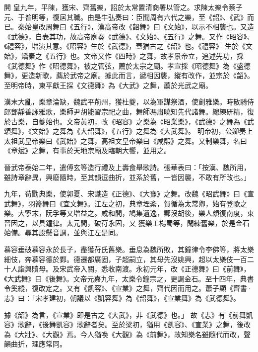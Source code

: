 
\begin{pinyinscope}

 開
 皇九年，平陳，獲宋、齊舊樂，詔於太常置清商署以管之。求陳太樂令蔡子元、于普明等，復居其職。由是牛弘奏曰：臣聞周有六代之樂，至《韶》、《武》而已。秦始皇改周舞曰《五行》，漢高帝改《韶舞》曰《文始》，以示不相襲也。又造《武德》，自表其功，故高帝廟奏《武德》、《文始》、《五行》之舞。又作《昭容》、《禮容》，增演其意。《昭容》生於《武德》，蓋猶古之《韶》也。《禮容》
 生於《文始》，矯秦之《五行》也。文帝又作《四時》之舞，故孝景帝立，追述先功，採《武德舞》作《昭德舞》，被之管弦，薦於太宗之廟。孝宣採《昭德舞》為《盛德舞》，更造新歌，薦於武帝之廟。據此而言，遞相因襲，縱有改作，並宗於《韶》。至明帝時，東平獻王採《文德舞》為《大武》之舞，薦於光武之廟。



 漢末大亂，樂章淪缺，魏武平荊州，獲杜夔，以為軍謀祭酒，使創雅樂。時散騎侍郎鄧靜善詠雅歌，樂師尹胡能習宗祀之曲，舞師馮肅曉知先代諸舞。總練研精，復於古樂，自夔始也。文帝黃初，改《昭容》之樂為《昭業樂》，《武德》之舞為《武頌舞》，《文始》之舞為《大韶舞》，《五行》之舞為《大武舞》。
 明帝初，公卿奏上太祖武皇帝樂曰《武始》之舞，高祖文皇帝樂曰《咸熙》之舞。又制樂舞，名曰《章斌》之舞，有事於天地宗廟及臨朝大饗，並用之。



 晉武帝泰始二年，遣傅玄等造行禮及上壽食舉歌詩。張華表曰：「按漢、魏所用，雖詩章辭異，興廢隨時，至其韻逗曲折，並系於舊，一皆因襲，不敢有所改也。」



 九年，荀勖典樂，使郭夏、宋識造《正德》、《大豫》之舞。改魏《昭武舞》曰《宣武舞》，羽籥舞曰《宜文舞》。江左之初，典章堙紊，賀循為太常卿，始有登歌之樂。大寧末，阮孚等又增益之。咸和間，鳩集遺逸，鄴沒胡後，樂人頗復南度，東晉因之，以具鐘律。太元間，破苻永固，又
 獲樂工楊蜀等，閑練舊樂，於是金石始備。尋其設懸音調，並與江左是同。



 慕容垂破慕容永於長子，盡獲苻氏舊樂。垂息為魏所敗，其鐘律令李佛等，將太樂細伎，奔慕容德於鄴。德遷都廣固，子超嗣立，其母先沒姚興，超以太樂伎一百二十人詣興贖母。及宋武帝入關，悉收南渡。永初元年，改《正德舞》曰《前舞》，《大武舞》曰《後舞》。文帝元嘉九年，太樂令鐘宗之，更調金石。至十四年，典書令奚縱，復改定之。又有《凱容》、《宣業》之舞，齊代因而用之。蕭子顯《齊書·志》曰：「宋孝建初，朝議以《凱容舞》為《韶舞》，《宣業舞》為《武德舞》。



 據《韶》為言，《宣業》即是古之《大武》，非《武德》也。」
 故《志》有《前舞凱容》歌辭，《後舞凱容》歌辭者矣。至於梁初，猶用《凱容》、《宣業》之舞，後改為《大壯》、《大觀》焉。今人猶喚《大觀》為《前舞》，故知樂名雖隨代而改，聲韻曲折，理應常同。




\end{pinyinscope}
